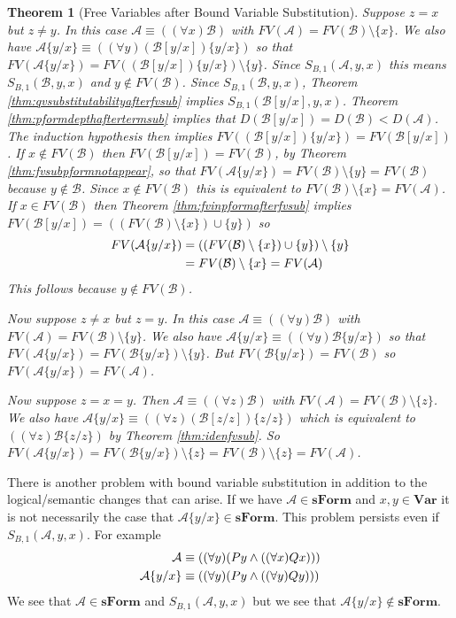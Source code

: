 \documentclass[12pt]{article}
\theoremstyle{break}
\theoremstyle{break}
\newtheorem{theorem}{Theorem}[section]
\theoremstyle{break}
\theoremstyle{break}
\theoremstyle{break}
\newtheorem{informal definition}[definition]{Informal Definition}
\newcommand{\mc}[1]{\mathcal{#1}}
\begin{document}
\begin{theorem}[Free Variables after Bound Variable Substitution]
Suppose $z=x$ but $z\not =y$.
In this case $\mc{A} \equiv ((\forall x) \mc{B})$ with $FV(\mc{A}) = FV(\mc{B}) \setminus\{x\}$.
We also have $\mc{A}\{y/x\} \equiv ((\forall y) (\mc{B}[y/x])\{y/x\})$ so that $FV(\mc{A}\{y/x\}) = FV((\mc{B}[y/x])\{y/x\}) \setminus \{y\}$.
Since $S_{B,1}(\mc{A}, y, x)$ this means $S_{B,1}(\mc{B}, y, x)$ and $y\not \in FV(\mc{B})$.
Since $S_{B,1}(\mc{B}, y, x)$, Theorem \ref{thm:qvsubstitutabilityafterfvsub} implies $S_{B,1}(\mc{B}[y/x], y, x)$.
Theorem \ref{thm:pformdepthaftertermsub} implies that $D(\mc{B}[y/x]) = D(\mc{B}) < D(\mc{A})$.
The induction hypothesis then implies $FV((\mc{B}[y/x])\{y/x\}) = FV(\mc{B}[y/x])$.
If $x\not \in FV(\mc{B})$ then $FV(\mc{B}[y/x]) = FV(\mc{B})$, by Theorem \ref{thm:fvsubpformnotappear}, so that $FV(\mc{A}\{y/x\}) = FV(\mc{B})\setminus \{y\} = FV(\mc{B})$ because $y\not \in \mc{B}$.
Since $x\not \in FV(\mc{B})$ this is equivalent to $FV(\mc{B})\setminus \{x\} = FV(\mc{A})$.
If $x\in FV(\mc{B})$ then Theorem \ref{thm:fvinpformafterfvsub} implies $FV(\mc{B}[y/x]) = ((FV(\mc{B})\setminus \{x\}) \cup \{y\})$ so
\begin{align}
FV(\mc{A}\{y/x\}) &= ((FV(\mc{B})\setminus \{x\}) \cup \{y\}) \setminus\{y\} \notag \\
&= FV(\mc{B})\setminus \{x\} = FV(\mc{A})
\end{align}
This follows because $y\not \in FV(\mc{B})$.

Now suppose $z \not = x$ but $z=y$.
In this case $\mc{A} \equiv ((\forall y)\mc{B})$ with $FV(\mc{A}) = FV(\mc{B})\setminus \{y\}$.
We also have $\mc{A}\{y/x\} \equiv ((\forall y) \mc{B}\{y/x\})$ so that $FV(\mc{A}\{y/x\}) = FV(\mc{B}\{y/x\})\setminus \{y\}$.
But $FV(\mc{B}\{y/x\}) = FV(\mc{B})$ so $FV(\mc{A}\{y/x\}) = FV(\mc{A})$.

Now suppose $z=x=y$.
Then $\mc{A}\equiv ((\forall z) \mc{B})$ with $FV(\mc{A}) = FV(\mc{B})\setminus \{z\}$.
We also have $\mc{A}\{y/x\} \equiv ((\forall z)(\mc{B}[z/z])\{z/z\})$
which is equivalent to $((\forall z)\mc{B}\{z/z\})$ by Theorem \ref{thm:idenfvsub}.
So $FV(\mc{A}\{y/x\}) = FV(\mc{B}\{y/x\}) \setminus \{z\} = FV(\mc{B})\setminus\{z\} = FV(\mc{A})$.
\end{theorem}

There is another problem with bound variable substitution in addition to the logical/semantic changes that can arise.
If we have $\mc{A}\in\textbf{sForm}$ and $x,y\in\textbf{Var}$ it is not necessarily the case that $\mc{A}\{y/x\}\in\textbf{sForm}$.
This problem persists even if $S_{B,1}(\mc{A}, y, x)$.
For example
\begin{align}
\mc{A} &\equiv ((\forall y) (Py \land ((\forall x) Qx))) \notag \\
\mc{A}\{y/x\} &\equiv ((\forall y) (Py\land ((\forall y) Qy))) \notag
\end{align}
We see that $\mc{A}\in\textbf{sForm}$ and $S_{B,1}(\mc{A}, y, x)$ but we see that $\mc{A}\{y/x\}\not \in \textbf{sForm}$.
\end{document}
